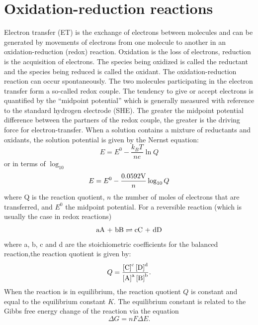 \documentclass[twoside,single]{lion-msc}
\begin{document}
\section{Oxidation-reduction reactions}
Electron transfer (ET) is the exchange of electrons between molecules and can be generated by movements of electrons from one molecule to another in an oxidation-reduction (redox) reaction. Oxidation is the loss of electrons, reduction is the acquisition of electrons. The species being oxidized is called the reductant and the species being reduced is called the oxidant. The oxidation-reduction reaction can occur spontaneously. The two molecules participating in the electron transfer form a so-called redox couple. The tendency to give or accept electrons is quantified by the ``midpoint potential'' which is generally measured with reference to the standard hydrogen electrode (SHE). The greater the midpoint potential difference between the partners of the redox couple, the greater is the driving force for electron-transfer. When a solution contains a mixture of reductants and oxidants, the solution potential is given by the Nernst equation:
\begin{equation} \label{nernst}
E = E^{0} - \frac{k_{B}T}{ne} \ln Q
\end{equation}
or in terms of $\log_{10}$
\begin{equation}
E = E^{0} - \frac{0.0592\textup{V}}{n} \log_{10} Q
\end{equation}
where Q is the reaction quotient, $n$ the number of moles of electrons that are transferred, and $E^{0}$ the midpoint potential. For a reversible reaction (which is usually the case in redox reactions)
\begin{equation}
 \textup{aA + bB}\rightleftharpoons\textup{cC + dD}
\end{equation}
where a, b, c and d are the stoichiometric coefficients for the balanced reaction,the reaction quotient is given by:
\begin{equation}
Q=\frac{\left [\textup{C}  \right ]^{\textup{c}}\left [\textup{D}  \right ]^{\textup{d}}}{\left [\textup{A}  \right ]^{\textup{a}}\left [\textup{B}  \right ]^{\textup{b}}}.
\end{equation}
When the reaction is in equilibrium, the reaction quotient $Q$ is constant and equal to the equilibrium constant $K$. The equilibrium constant is related to the Gibbs free energy change of the reaction via the equation
\begin{equation}
\Delta G =  nF \Delta E .
\end{equation}
\end{document}
